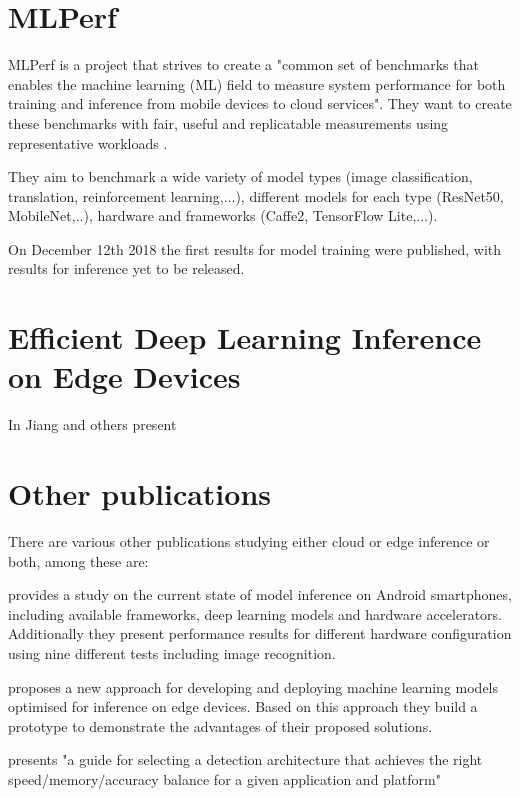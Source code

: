 \section{MLPerf}
MLPerf is a project that strives to create a "common set of benchmarks that enables the machine learning (ML) field to measure system performance for both training and inference from mobile devices to cloud services"\cite{mlperfWebsite}.
They want to create these benchmarks with fair, useful and replicatable measurements using representative workloads \cite{mlperf}. 

They aim to benchmark a wide variety of model types (image classification, translation, reinforcement learning,...), different models for each type (ResNet50, MobileNet,..), hardware and frameworks (Caffe2, TensorFlow Lite,...).

On December 12th 2018 the first results for model training were published, with results for inference yet to be released.

\section{Efficient Deep Learning Inference on Edge Devices}
In \cite{jiang2018efficient} Jiang and others present 
\section{Other publications}
There are various other publications studying either cloud or edge inference or both, among these are:



\cite{DBLP:journals/corr/abs-1810-01109} provides a study on the current state of model inference on Android smartphones, including available frameworks, deep learning models and hardware accelerators. Additionally they present performance results for different hardware configuration using nine different tests including image recognition.

\cite{rethinkingDeployment} proposes a new approach for developing and deploying machine learning models optimised for inference on edge devices. Based on this approach they build a prototype to demonstrate the advantages of their proposed solutions.


\cite{DBLP:journals/corr/HuangRSZKFFWSG016} presents "a guide for selecting a detection architecture that achieves the right
speed/memory/accuracy balance for a given application and platform"


